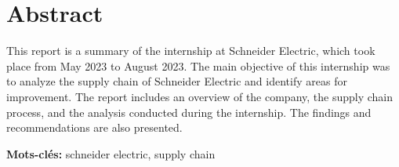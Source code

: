 \chapter*{\Large \center Abstract}
This report is a summary of the internship at Schneider Electric, which took place from May 2023 to August 2023.
The main objective of this internship was to analyze the supply chain of Schneider Electric and identify areas for improvement.
The report includes an overview of the company, the supply chain process, and the analysis conducted during the internship.
The findings and recommendations are also presented.

\newcommand{\mykeywords}[1]{\noindent \textbf{Mots-clés:} #1}
\mykeywords{schneider electric, supply chain}
